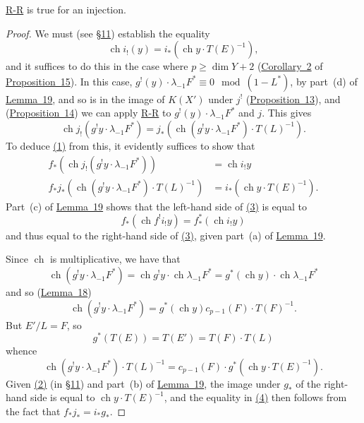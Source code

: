 \documentclass{article}
\theoremstyle{plain}
\newenvironment{proposition}[1]
    {\renewcommand\theinnerproposition{#1}\innerproposition}
    {\endinnerproposition}
\theoremstyle{definition}
\renewcommand{\geq}{\geqslant}
\DeclareMathOperator{\ch}{ch}
\newcommand{\oldpage}[1]{\marginpar{\footnotesize$\Big\vert$ \textit{p.~#1}}}
\begin{document}
\oldpage{129}
\begin{proposition}{15}
\label{proposition15}
  \hyperref[theoremriemannroch]{R-R} is true for an injection.
\end{proposition}

\begin{proof}
  We must (see \hyperref[section11]{\S11}) establish the equality
  \[
  \label{proposition15equation1}
    \ch i_!(y) = i_*(\ch y\cdot T(E)^{-1}),
    \tag{1}
  \]
  and it suffices to do this in the case where $p\geq\dim Y+2$ (\hyperref[corollary2]{Corollary~2} of \hyperref[proposition15]{Proposition~15}).
  In this case, $g^!(y)\cdot\lambda_{-1}F^*\equiv0\mod(1-L^*)$, by part~(d) of \hyperref[lemma19]{Lemma~19}, and so is in the image of $K(X')$ under $j^!$ (\hyperref[proposition13]{Proposition~13}), and (\hyperref[proposition14]{Proposition~14}) we can apply \hyperref[theoremriemannroch]{R-R} to $g^!(y)\cdot\lambda_{-1}F^*$ and $j$.
  This gives
  \[
  \label{proposition15equation2}
    \ch j_!(g^! y\cdot\lambda_{-1}F^*)
    = j_*(\ch(g^! y\cdot \lambda_{-1}F^*)\cdot T(L)^{-1}).
    \tag{2}
  \]
  To deduce \hyperref[proposition15equation1]{(1)} from this, it evidently suffices to show that
  \begin{align*}
  \label{proposition15equation3}
    f_*(\ch j_!(g^!y\cdot\lambda_{-1}F^*)) &= \ch i_! y
    \tag{3}
  \\
  \label{proposition15equation4}f_*j_*(\ch(g^!y\cdot\lambda_{-1}F^*)\cdot T(L)^{-1}) &= i_*(\ch y\cdot T(E)^{-1}).
    \tag{4}
  \end{align*}
  Part~(c) of \hyperref[lemma19]{Lemma~19} shows that the left-hand side of \hyperref[proposition15equation3]{(3)} is equal to
  \[
    f_*(\ch f^!i_!y) = f_*^*(\ch i_!y)
  \]
  and thus equal to the right-hand side of \hyperref[proposition15equation3]{(3)}, given part~(a) of \hyperref[lemma19]{Lemma~19}.

  Since $\ch$ is multiplicative, we have that
  \[
    \ch(g^!y\cdot\lambda_{-1}F^*)
    = \ch g^!y\cdot\ch\lambda_{-1}F^*
    = g^*(\ch y)\cdot\ch\lambda_{-1}F^*
  \]
  and so (\hyperref[lemma18]{Lemma~18})
  \[
    \ch(g^!y\cdot\lambda_{-1}F^*) = g^*(\ch y)c_{p-1}(F)\cdot T(F)^{-1}.
  \]
  But $E'/L=F$, so
  \[
    g^*(T(E)) = T(E') = T(F)\cdot T(L)
  \]
  whence
  \[
    \ch(g^!y\cdot\lambda_{-1}F^*)\cdot T(L)^{-1} = c_{p-1}(F)\cdot g^*(\ch y\cdot T(E)^{-1}).
  \]
  Given \hyperref[section11equation2]{(2)} (in \hyperref[section11]{\S11}) and part~(b) of \hyperref[lemma19]{Lemma~19}, the image under $g_*$ of the right-hand side is equal to $\ch y\cdot T(E)^{-1}$, and the equality in \hyperref[proposition15equation4]{(4)} then follows from the fact that $f_*j_*=i_*g_*$.
\end{proof}
\end{document}
